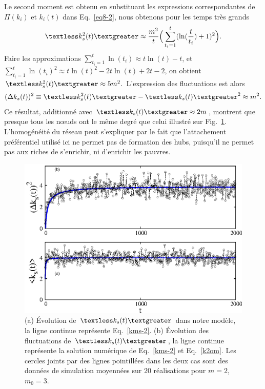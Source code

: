 Le second moment est obtenu en substituant les expressions correspondantes de $\Pi(k_i)$ et $k_i(t)$ dans Eq.~\eqref {eq8-2}, nous obtenons pour les temps très grands
 \begin{eqnarray}
\begin{split}
\kmss\approx \frac{m^2}{t}\Big(\sum_{t_i=1}^t (\ln(\frac{t}{t_i})+1)^2\Big).
\label{k2om}
\end{split}
\end{eqnarray}
Faire les approximations  $\sum_{t_i=1}^t \ln(t_i)\approx t\ln(t)-t$, et
$\sum_{t_i=1}^t \ln(t_i)^2\approx t\ln(t)^2-2t\ln(t)+2t-2$, on obtient $\kmss\approx 5m^2.$ L'expression des fluctuations est alors 
\begin{eqnarray}
 (\Delta k_s(t))^2 \equiv {\kmss-\kms^2}\approx m^2.
\end{eqnarray}
 Ce résultat, additionné avec $\kms\approx 2m $, montrent que presque tous les nœuds ont le même degré que celui illustré sur Fig.~\ref{fig2b-2}. L'homogénéité du réseau peut s'expliquer par le fait que l'attachement préférentiel utilisé ici ne permet pas de formation des hubs, puisqu'il ne permet pas aux riches de s'enrichir, ni d'enrichir les pauvres. 
\begin{figure}[h]
	\centering
	\includegraphics[scale=1]{./figures/nfig3}
	\caption{(a) Évolution de $\kms$ dans notre modèle, la ligne continue représente Eq.~\eqref{kms-2}.
	(b) Évolution des fluctuations de $\kms$, la ligne continue représente la solution numérique de Eq.~\eqref{kms-2} et Eq.~\eqref{k2om}. Les cercles joints par des lignes pointillées dans les deux cas sont des données de simulation moyennées sur $20$ réalisations pour $m=2$, $m_0=3$.}
	\label{fig2b-2}
\end{figure}
 \vspace{4cm}
